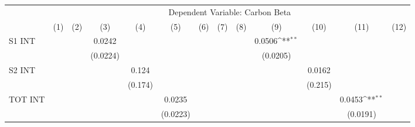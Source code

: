 {
\def\sym#1{\ifmmode^{#1}\else\(^{#1}\)\fi}
\begin{tabular}{l*{12}{c}}
\hline\hline
                    &\multicolumn{12}{c}{Dependent Variable: Carbon Beta}                                                                                                                                                                                                                   \\\cmidrule(lr){2-13}
                    &\multicolumn{1}{c}{(1)}         &\multicolumn{1}{c}{(2)}         &\multicolumn{1}{c}{(3)}         &\multicolumn{1}{c}{(4)}         &\multicolumn{1}{c}{(5)}         &\multicolumn{1}{c}{(6)}         &\multicolumn{1}{c}{(7)}         &\multicolumn{1}{c}{(8)}         &\multicolumn{1}{c}{(9)}         &\multicolumn{1}{c}{(10)}         &\multicolumn{1}{c}{(11)}         &\multicolumn{1}{c}{(12)}         \\
\hline
S1 INT              &                     &                     &      0.0242         &                     &                     &                     &                     &                     &      0.0506\sym{**} &                     &                     &                     \\
                    &                     &                     &    (0.0224)         &                     &                     &                     &                     &                     &    (0.0205)         &                     &                     &                     \\
S2 INT              &                     &                     &                     &       0.124         &                     &                     &                     &                     &                     &      0.0162         &                     &                     \\
                    &                     &                     &                     &     (0.174)         &                     &                     &                     &                     &                     &     (0.215)         &                     &                     \\
TOT INT             &                     &                     &                     &                     &      0.0235         &                     &                     &                     &                     &                     &      0.0453\sym{**} &                     \\
                    &                     &                     &                     &                     &    (0.0223)         &                     &                     &                     &                     &                     &    (0.0191)         &                     \\

\end{tabular}}
